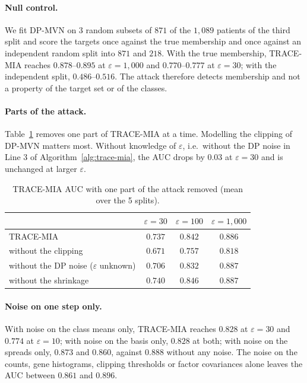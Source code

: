 \documentclass{article}
\newcommand{\dpmvn}{DP-MVN}
\newcommand{\ours}{TRACE-MIA}
\begin{document}
\paragraph{Null control.}
We fit \dpmvn{} on $3$ random subsets of $871$ of the $1{,}089$ patients of the third split and score the targets once against the true membership and once against an independent random split into $871$ and $218$. With the true membership, \ours{} reaches $0.878$--$0.895$ at $\varepsilon=1{,}000$ and $0.770$--$0.777$ at $\varepsilon=30$; with the independent split, $0.486$--$0.516$. The attack therefore detects membership and not a property of the target set or of the classes.

\paragraph{Parts of the attack.}
Table~\ref{tab:abl-attack} removes one part of \ours{} at a time. Modelling the clipping of \dpmvn{} matters most. Without knowledge of $\varepsilon$, i.e.\ without the DP noise in Line 3 of Algorithm~\ref{alg:trace-mia}, the AUC drops by $0.03$ at $\varepsilon=30$ and is unchanged at larger $\varepsilon$.

\begin{table}[h]
\centering
\caption{\ours{} AUC with one part of the attack removed (mean over the 5 splits).}
\label{tab:abl-attack}
\footnotesize
\begin{tabular}{lccc}
\toprule
 & $\varepsilon=30$ & $\varepsilon=100$ & $\varepsilon=1{,}000$ \\
\midrule
\ours{}                        & $0.737$ & $0.842$ & $0.886$ \\
without the clipping            & $0.671$ & $0.757$ & $0.818$ \\
without the DP noise ($\varepsilon$ unknown) & $0.706$ & $0.832$ & $0.887$ \\
without the shrinkage           & $0.740$ & $0.846$ & $0.887$ \\
\bottomrule
\end{tabular}
\end{table}

\paragraph{Noise on one step only.}
With noise on the class means only, \ours{} reaches $0.828$ at $\varepsilon=30$ and $0.774$ at $\varepsilon=10$; with noise on the basis only, $0.828$ at both; with noise on the spreads only, $0.873$ and $0.860$, against $0.888$ without any noise. The noise on the counts, gene histograms, clipping thresholds or factor covariances alone leaves the AUC between $0.861$ and $0.896$.
\end{document}
